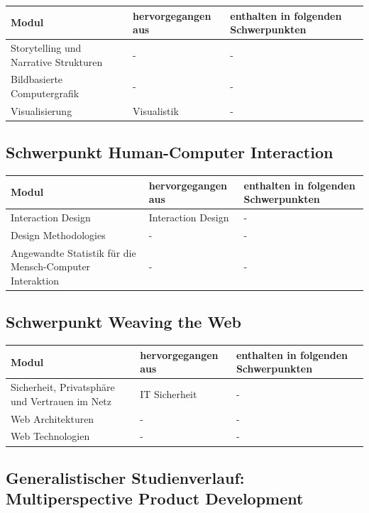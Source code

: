 \begin{longtable}[]{@{}lll@{}}
\toprule
Modul & hervorgegangen aus & enthalten in folgenden
Schwerpunkten\tabularnewline
\midrule
\endhead
Storytelling und Narrative Strukturen & - & -\tabularnewline
Bildbasierte Computergrafik & - & -\tabularnewline
Visualisierung & Visualistik & -\tabularnewline
\bottomrule
\end{longtable}

\subsection{Schwerpunkt Human-Computer
Interaction}\label{schwerpunkt-human-computer-interaction}

\begin{longtable}[]{@{}lll@{}}
\toprule
Modul & hervorgegangen aus & enthalten in folgenden
Schwerpunkten\tabularnewline
\midrule
\endhead
Interaction Design & Interaction Design & -\tabularnewline
Design Methodologies & - & -\tabularnewline
Angewandte Statistik für die Mensch-Computer Interaktion & - &
-\tabularnewline
\bottomrule
\end{longtable}

\subsection{Schwerpunkt Weaving the
Web}\label{schwerpunkt-weaving-the-web}

\begin{longtable}[]{@{}lll@{}}
\toprule
Modul & hervorgegangen aus & enthalten in folgenden
Schwerpunkten\tabularnewline
\midrule
\endhead
Sicherheit, Privatsphäre und Vertrauen im Netz & IT Sicherheit &
-\tabularnewline
Web Architekturen & - & -\tabularnewline
Web Technologien & - & -\tabularnewline
\bottomrule
\end{longtable}

\subsection{Generalistischer Studienverlauf: Multiperspective Product
Development}\label{generalistischer-studienverlauf-multiperspective-product-development}

